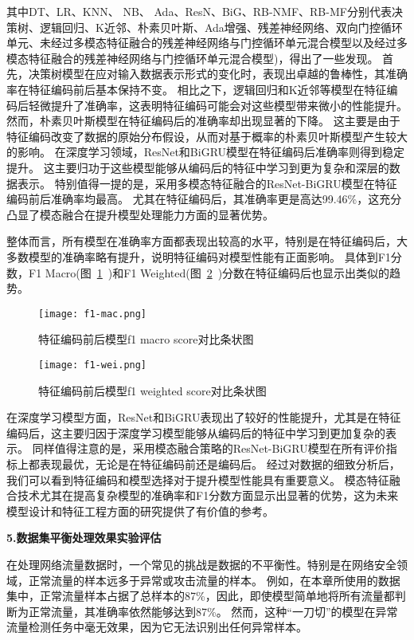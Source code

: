 其中DT、LR、KNN、 NB、 Ada、ResN、BiG、RB-NMF、RB-MF分别代表决策树、逻辑回归、K近邻、朴素贝叶斯、Ada增强、残差神经网络、双向门控循环单元、未经过多模态特征融合的残差神经网络与门控循环单元混合模型以及经过多模态特征融合的残差神经网络与门控循环单元混合模型)，得出了一些发现。
首先，决策树模型在应对输入数据表示形式的变化时，表现出卓越的鲁棒性，其准确率在特征编码前后基本保持不变。
相比之下，逻辑回归和K近邻等模型在特征编码后轻微提升了准确率，这表明特征编码可能会对这些模型带来微小的性能提升。
然而，朴素贝叶斯模型在特征编码后的准确率却出现显著的下降。
这主要是由于特征编码改变了数据的原始分布假设，从而对基于概率的朴素贝叶斯模型产生较大的影响。
在深度学习领域，ResNet和BiGRU模型在特征编码后准确率则得到稳定提升。
这主要归功于这些模型能够从编码后的特征中学习到更为复杂和深层的数据表示。
特别值得一提的是，采用多模态特征融合的ResNet-BiGRU模型在特征编码前后准确率均最高。
尤其在特征编码后，其准确率更是高达99.46\%，这充分凸显了模态融合在提升模型处理能力方面的显著优势。\par


整体而言，所有模型在准确率方面都表现出较高的水平，特别是在特征编码后，大多数模型的准确率略有提升，说明特征编码对模型性能有正面影响。
具体到F1分数，F1 Macro(图~\ref{fig:f1_macro_score}~)和F1 Weighted(图~\ref{fig:f1_weighted_score}~)分数在特征编码后也显示出类似的趋势。
\begin{figure}[htbp]
	\centering
	\texttt{[image: f1-mac.png]}
	\caption{特征编码前后模型f1 macro score对比条状图}
	\label{fig:f1_macro_score}
\end{figure}
\begin{figure}[htbp]
	\centering
	\texttt{[image: f1-wei.png]}
	\caption{特征编码前后模型f1 weighted score对比条状图}
	\label{fig:f1_weighted_score}
\end{figure}
在深度学习模型方面，ResNet和BiGRU表现出了较好的性能提升，尤其是在特征编码后，这主要归因于深度学习模型能够从编码后的特征中学习到更加复杂的表示。
同样值得注意的是，采用模态融合策略的ResNet-BiGRU模型在所有评价指标上都表现最优，无论是在特征编码前还是编码后。
经过对数据的细致分析后，我们可以看到特征编码和模型选择对于提升模型性能具有重要意义。
模态特征融合技术尤其在提高复杂模型的准确率和F1分数方面显示出显著的优势，这为未来模型设计和特征工程方面的研究提供了有价值的参考。\par

\textbf{5.数据集平衡处理效果实验评估}\par
在处理网络流量数据时，一个常见的挑战是数据的不平衡性。特别是在网络安全领域，正常流量的样本远多于异常或攻击流量的样本。
例如，在本章所使用的数据集中，正常流量样本占据了总样本的87\%，因此，即使模型简单地将所有流量都判断为正常流量，其准确率依然能够达到87\%。
然而，这种“一刀切”的模型在异常流量检测任务中毫无效果，因为它无法识别出任何异常样本。\par

